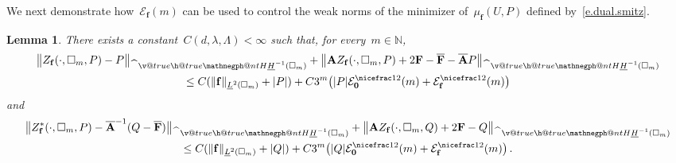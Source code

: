 \documentclass[11pt,twoside]{article} %
\makeatletter
\let\oldsquare\square %
\renewcommand{\square}{\oldsquare}
\numberwithin{equation}{section}
\newtheorem{lemma}[theorem]{Lemma}
\theoremstyle{definition}
\newcommand*{\N}{\ensuremath{\mathbb{N}}}
\renewcommand*{\hat}{\widehat}
\newcommand{\f}{\mathbf{f}}
\newcommand{\bfzero}{\boldsymbol{0}}
\newcommand{\cu}{\square}
\newcommand{\negphantom}{\v@true\h@true\negph@nt}
\newcommand{\negph@nt}{\ifmmode\expandafter\mathpalette 
  \expandafter\mathnegph@nt\else\expandafter\makenegph@nt\fi}
\newcommand{\makenegph@nt}[1]{%
  \setbox\z@\hbox{\color@begingroup#1\color@endgroup}\finnegph@nt}
\newcommand{\finnegph@nt}{%
  \setbox\tw@\null 
  \ifv@ \ht\tw@\ht\z@\dp\tw@\dp\z@\fi \ifh@\wd\tw@-\wd\z@\fi\box\tw@}
\newcommand{\mathnegph@nt}[2]{%
  \setbox\z@\hbox{$\m@th #1{#2}$}\finnegph@nt}
\newcommand{\Hminusul}{\hat{\phantom{H}}\negphantom{H}\underline{H}^{-1}}
\newcommand{\bfA}{\mathbf{A}}
\newcommand{\bfAhom}{\overline{\mathbf{A}}}
\newcommand{\bfF}{\mathbf{F}}
\makeatother
\begin{document}
\smallskip

We next demonstrate how~$\mathcal{E}_{\f}(m)$ can be used to control the weak norms of the minimizer of~$\mu_{\f}(U,P)$ defined by~\eqref{e.dual.smitz}.


\begin{lemma} 
\label{l.f.Hminusone.zero}
There exists a constant~$C(d,\lambda,\Lambda)<\infty$ such that, for every~$m \in \N$, 
\begin{multline}
\label{e.f.Hminusone.zero}  
\bigl\| Z_{\f}(\cdot,\cu_m,P) -P \bigr\|_{\Hminusul(\cu_m)}
+
\bigl\| \bfA Z_{\f}(\cdot,\cu_m,P) + 2\bfF - \overline{\bfF} - \bfAhom P \bigr\|_{\Hminusul(\cu_m)}
\\
\leq 
C( \| \f \|_{\underline{L}^2(\cu_m)} + |P|) + C3^m \bigl(  |P| \mathcal{E}_{\bfzero}^{\nicefrac12}(m) + \mathcal{E}_{\f}^{\nicefrac12}(m) \bigr) 
\end{multline}
and
\begin{multline}
\label{e.f.Hminusone.zero.star}  
\bigl\| Z_{\f}^*(\cdot,\cu_m,P) - \bfAhom^{-1}(Q - \overline{\bfF} ) \bigr\|_{\Hminusul(\cu_m)}
+
\bigl\| \bfA Z_{\f}(\cdot,\cu_m,Q) + 2\bfF - Q \bigr\|_{\Hminusul(\cu_m)}
\\
\leq 
C( \| \f \|_{\underline{L}^2(\cu_m)} + |Q|) + C3^m \bigl(  |Q| \mathcal{E}_{\bfzero}^{\nicefrac12}(m) + \mathcal{E}_{\f}^{\nicefrac12}(m) \bigr) 
\,.
\end{multline}

\end{lemma}
\end{document}
